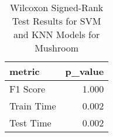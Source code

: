 \begin{table}
\centering
\caption{Wilcoxon Signed-Rank Test Results for SVM and KNN Models for Mushroom}
\label{tab:svm_knn_wilcoxon_comparison_mushroom}
\begin{tabular}{lr}
\toprule
metric & p_value \\
\midrule
F1 Score & 1.000 \\
Train Time & 0.002 \\
Test Time & 0.002 \\
\bottomrule
\end{tabular}
\end{table}
